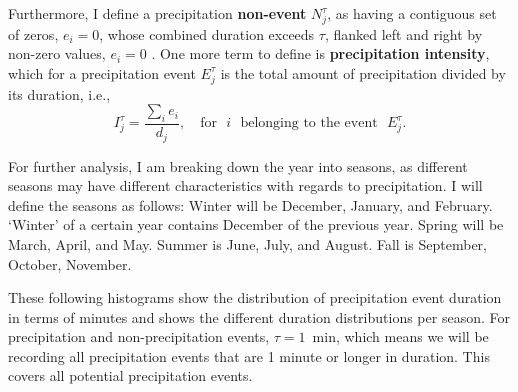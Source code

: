 \documentclass[11pt]{report}
\newcommand{\fracd}[2]{\frac{\displaystyle{#1}}{\displaystyle{#2}}}
\begin{document}
Furthermore, I define a precipitation \textbf{non-event} $N_j^\tau$, as
having a contiguous set of zeros, $e_i=0$, whose combined duration exceeds
$\tau$, flanked left and right by non-zero values, $e_i=0$ \cite{Eagleson}.
One more term to define is \textbf{precipitation intensity}, which for a
precipitation event $E_j^\tau$ is the total amount of precipitation divided
by its duration, i.e.,
\begin{equation}
	I_j^\tau = \fracd{\sum_i e_i }{d_j} ,
	\quad
	\mbox{for}\,\,\,\, i\,\,\,\, \mbox{belonging to the event}\,\,\,\, E_j^\tau
	.
\end{equation}

For further analysis, I am breaking down the year into seasons, as different
seasons may have different characteristics with regards to precipitation. I
will define the seasons as follows: Winter will be December, January, and
February. `Winter' of a certain year contains December of the previous
year. Spring will be March, April, and May. Summer is June, July, and
August. Fall is September, October, November.

These following histograms show the distribution of precipitation event
duration in terms of minutes and shows the different duration distributions
per season. For precipitation and non-precipitation events, $\tau = 1$~min, which means we will be recording all precipitation events that are 1 minute or longer in duration. This covers all potential precipitation events. 
\end{document}
